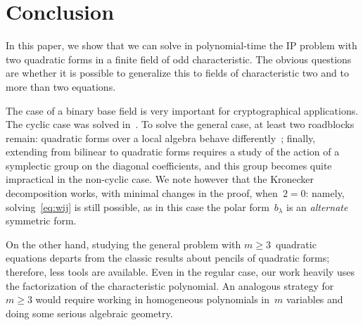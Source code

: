 \documentclass{lms}%
\begin{document}
\section*{Conclusion}

In this paper, we show that we can solve in polynomial-time the IP
problem with two quadratic forms in a finite field of odd characteristic.
The obvious questions are whether it is possible to generalize this to
fields of characteristic two and to more than two equations.

The case of a binary base field is very important for cryptographical
applications. The cyclic case was solved in~\cite{MPG2013}. To solve
the general case, at least two roadblocks remain:
quadratic
forms over a local algebra behave differently~\cite[§93]{omeara};
finally, extending from bilinear to quadratic forms requires a study of
the action of a symplectic group on the diagonal coefficients, and this
group becomes quite impractical in the non-cyclic case. We note however
that the Kronecker decomposition works, with minimal changes in the
proof, when~$2 = 0$: namely, solving~\eqref{eq:wij} is still possible, as
in this case the polar form~$b_{λ}$ is an \emph{alternate} symmetric
form.

On the other hand, studying the general problem with $m ≥ 3$~quadratic
equations departs from the classic results about pencils of quadratic
forms; therefore, less tools are available. Even in the regular
case, our work heavily uses the factorization of the characteristic
polynomial. An analogous strategy for~$m ≥ 3$ would require working in
homogeneous polynomials in~$m$ variables and doing some serious algebraic
geometry.




\iffalse
\appendix
\end{document}
